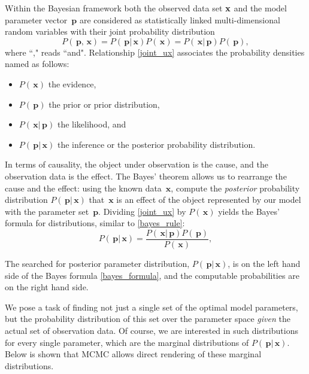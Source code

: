 \documentclass[preprint2]{aastex}
\newcommand{\bfp}{\,\mathbf{p}}
\newcommand{\bfx}{\,\mathbf{x}}
\begin{document}
Within the Bayesian framework both the observed data set $\bf{x}$ and the model parameter vector $\bfp$ are considered as statistically linked multi-dimensional random variables with their joint probability distribution
\begin{equation}
  \label{joint_ux}
  P(\bfp,\bfx) =  P(\bfp|\bfx)P(\bfx) = P(\bfx|\bfp)P(\bfp),
\end{equation}
where ``," reads ``and". Relationship \eqref{joint_ux} associates the probability densities named as follows:
\begin{itemize}
  \item[-] $P(\bfx)$ the evidence,
  \item[-] $P(\bfp)$ the prior or prior distribution,
  \item[-] $P(\bfx|\bfp)$ the likelihood, and
  \item[-] $P(\bfp|\bfx)$ the inference or the posterior probability distribution.
\end{itemize}
In terms of causality, the object under observation is the cause, and the observation data is the effect. The Bayes' theorem allows us to rearrange the cause and the effect: using the known data $\bfx$, compute the \emph{posterior} probability distribution $P(\bfp|\bfx)$ that $\bfx$ is an effect of the object represented by our model with the parameter set $\bfp$. 
Dividing \eqref{joint_ux} by $P(\bfx)$ yields the Bayes' formula for distributions, similar to \eqref{bayes_rule}:
\begin{equation}
  \label{bayes_formula}
  P(\bfp|\bfx) =  \frac{P(\bfx|\bfp)P(\bfp)}{P(\bfx)},
\end{equation}

The searched for posterior parameter distribution, $P(\bfp|\bfx)$, is on the left hand side of the Bayes formula \eqref{bayes_formula}, and the computable probabilities are on the right hand side. 

We pose a task of finding not just a single set of the optimal model parameters, but the probability distribution of this set over the parameter space \emph{given} the actual set of observation data. Of course, we are interested in such distributions for every single parameter, which are the marginal distributions of $P(\bfp|\bfx)$. Below is shown that MCMC allows direct rendering of these marginal distributions. 
\end{document}
